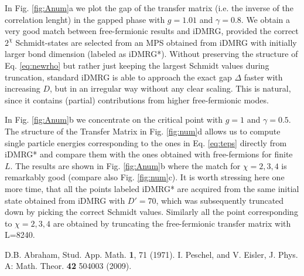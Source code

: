 \documentclass[prl,twocolumn,showpacs,floatfix,superscriptaddress,nofootinbib]{revtex4-1}
\begin{document}
In Fig. \ref{fig:Anum}a  we plot the gap of the transfer matrix (i.e. the inverse of the correlation lenght) in the gapped phase with $g=1.01$ and $\gamma=0.8$. We obtain a very good match between free-fermionic results and iDMRG, provided the correct $2^{\chi}$ Schmidt-states are selected from an MPS obtained from iDMRG with initially larger bond dimension (labeled as iDMRG*). Without preserving the structure of Eq. \eqref{eq:newrho} but rather just keeping the largest Schmidt values during truncation, standard iDMRG is able to approach the exact gap $\Delta$ faster with increasing $D$, but in an irregular way without any clear scaling. This is natural, since it contains (partial) contributions from higher free-fermionic modes.

In Fig. \ref{fig:Anum}b we concentrate on the critical point with $g=1$ and $\gamma=0.5$. The structure of the Transfer Matrix in Fig. \ref{fig:num}d allows us to compute single particle energies corresponding to the ones in Eq. \eqref{eq:teps} directly from iDMRG* and compare them with the ones obtained with free-fermions for finite $L$. 
The results are shown in Fig. \ref{fig:Anum}b  where the match for $\chi = 2,3,4$ is remarkably good (compare also Fig. \ref{fig:num}c). It is worth stressing here one more time, that all the points labeled iDMRG* are acquired  from the same initial state obtained from iDMRG with $D'=70$, which was subsequently truncated down by picking the correct Schmidt values. Similarly all the point corresponding to $\chi=2,3,4$ are obtained by truncating the free-fermionic transfer matrix with L=8240.

\begin{thebibliography}{99}
 D.B. Abraham, Stud. App. Math. {\bf 1}, 71 (1971).
 I. Peschel, and V. Eisler, J. Phys. A: Math. Theor. {\bf 42} 504003 (2009).

\end{thebibliography}


\end{document}
